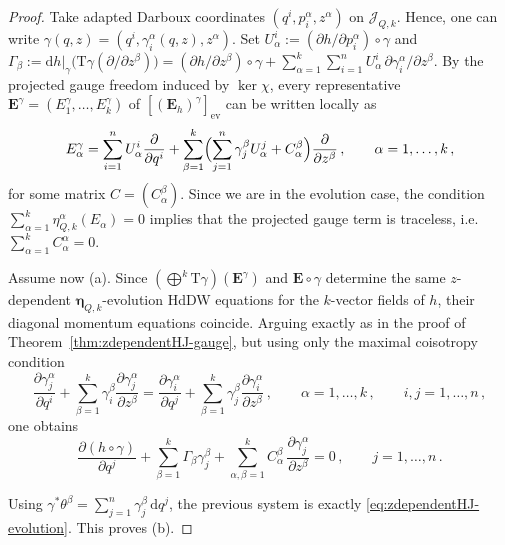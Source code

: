 \documentclass[11pt,twoside]{article}
\theoremstyle{plain}
\theoremstyle{definition}
\theoremstyle{remark}
\newcommand{\dd}{\mathrm{d}}
\renewcommand{\d}{\mathrm{d}}
\newcommand{\T}{\mathrm{T}}
\begin{document}
\begin{proof}
Take adapted Darboux coordinates $(q^i,p^\alpha_i,z^\alpha)$ on $\mathcal J_{Q,k}$. Hence, one can write $\gamma(q,z)=(q^i,\gamma^\alpha_i(q,z),z^\alpha)$. Set
$U_\alpha^i:=(\partial h/\partial p^\alpha_i)\circ\gamma$ and
$\Gamma_\beta:=\dd h|_\gamma\bigl(\T\gamma(\partial/\partial z^\beta)\bigr)
=(\partial h/\partial z^\beta)\circ\gamma
+\sum_{\alpha=1}^k\sum_{i=1}^n U_\alpha^i\,\partial\gamma^\alpha_i/\partial z^\beta$. By the projected gauge freedom induced by $\ker\chi$, every representative
$\mathbf E^\gamma=(E^\gamma_1,\dots,E^\gamma_k)$ of $[(\mathbf E_h)^\gamma]_{\mathrm{ev}}$
can be written locally as
\[
E^\gamma_\alpha
= \sum_{i=1}^n U_\alpha^i \frac{\partial}{\partial q^i}
+ \sum_{\beta=1}^k\Bigl(\sum_{j=1}^n \gamma^\beta_j U_\alpha^j + C^\beta_{\alpha}\Bigr)
\frac{\partial}{\partial z^\beta}\,,
\qquad \alpha=1,\dots,k\,,
\]
for some matrix $C=(C^\beta_{\alpha})$. Since we are in the evolution case, the condition
$\sum_{\alpha=1}^k \eta^\alpha_{Q,k}(E_\alpha)=0$ implies that the projected gauge term is
traceless, i.e. $\sum_{\alpha=1}^k C^\alpha_{\alpha}=0$.

Assume now (a). Since $(\bigoplus^k \T\gamma)(\mathbf E^\gamma)$ and $\mathbf E\circ\gamma$
determine the same $z$-dependent $\bm\eta_{Q,k}$-evolution HdDW equations for the $k$-vector fields of $h$, their diagonal momentum
equations coincide. Arguing exactly as in the proof of Theorem~\ref{thm:zdependentHJ-gauge}, but using only the maximal
coisotropy condition
\[
\frac{\partial\gamma^\alpha_j}{\partial q^i}
+\sum_{\beta=1}^k \gamma^\beta_i\frac{\partial\gamma^\alpha_j}{\partial z^\beta}
=
\frac{\partial\gamma^\alpha_i}{\partial q^j}
+\sum_{\beta=1}^k \gamma^\beta_j\frac{\partial\gamma^\alpha_i}{\partial z^\beta}\,,
\qquad \alpha=1,\dots,k\,,\qquad i,j=1,\dots,n\,,
\]
one obtains
\[
\frac{\partial(h\circ\gamma)}{\partial q^j}
+\sum_{\beta=1}^k \Gamma_\beta \gamma^\beta_j
+\sum_{\alpha,\beta=1}^k C^\beta_{\alpha}\,
\frac{\partial\gamma^\alpha_j}{\partial z^\beta}=0\,,
\qquad j=1,\dots,n\,.
\]

Using
$\gamma^*\theta^\beta=\sum_{j=1}^n \gamma^\beta_j\,\d q^j$, the previous system is exactly
\eqref{eq:zdependentHJ-evolution}. This proves (b).


\end{proof}
\end{document}
